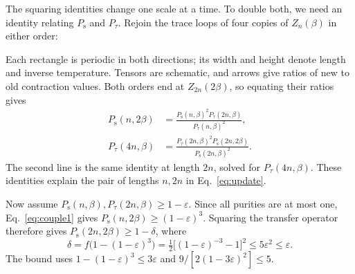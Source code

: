 \documentclass[aps,prl,reprint,amsmath,amssymb,nofootinbib,raggedbottom]{revtex4-2}
\newcommand{\Ps}{P_{\mathrm{s}}}
\newcommand{\Pt}{P_{\tau}}
\newenvironment{proofdiagram}{\par\smallskip\noindent\begin{minipage}{\columnwidth}\centering}{\end{minipage}\par\smallskip}
\newcommand{\netpatch}[4]{%
 \begin{scope}[shift={(#1,#2)}]
 \fill[mpoblue!10] (0,0) rectangle ({.4*#3},{.4*#4});
 \draw[black!35,densely dashed,line width=.35pt]
   (0,0) rectangle ({.4*#3},{.4*#4});
 \foreach \i in {1,...,#3}{
   \draw[wire] ({.4*\i-.2},0)--({.4*\i-.2},{.4*#4});}
 \foreach \j in {1,...,#4}{
   \draw[wire] (0,{.4*\j-.2})--({.4*#3},{.4*\j-.2});
   \foreach \i in {1,...,#3}{
     \node[tensor,minimum size=.10cm] at ({.4*\i-.2},{.4*\j-.2}) {};}}
 \end{scope}}
\begin{document}
The squaring identities change one scale at a time. To double both, we need an
identity relating $\Ps$ and $\Pt$. Rejoin the trace loops of four copies
of $Z_n(\beta)$ in either order:
\begin{proofdiagram}
\end{proofdiagram}
Each rectangle is periodic in both directions; its width and height
denote length and inverse temperature. Tensors are schematic, and
arrows give ratios of new to old contraction values. Both orders end
at $Z_{2n}(2\beta)$, so equating their ratios gives
\begin{align}
 \Ps(n,2\beta)&=\frac{\Ps(n,\beta)^2\Pt(2n,\beta)}{\Pt(n,\beta)^2},
 \label{eq:couple1}\\
 \Pt(4n,\beta)&=\frac{\Pt(2n,\beta)^2\Ps(2n,2\beta)}{\Ps(2n,\beta)^2}.
 \label{eq:couple2}
\end{align}
The second line is the same identity at length $2n$, solved for
$\Pt(4n,\beta)$. These identities explain the pair of lengths $n,2n$
in Eq.~\eqref{eq:update}.

Now assume $\Ps(n,\beta),\Pt(2n,\beta)\ge1-\varepsilon$.
Since all purities are at most one, Eq.~\eqref{eq:couple1} gives
$\Ps(n,2\beta)\ge(1-\varepsilon)^3$. Squaring the transfer operator
therefore gives $\Ps(2n,2\beta)\ge1-\delta$, where
\begin{equation}
 \delta=f\bigl(1-(1-\varepsilon)^3\bigr)
 =\tfrac12\bigl[(1-\varepsilon)^{-3}-1\bigr]^2
 \le5\varepsilon^2\le\varepsilon.
 \label{eq:delta}
\end{equation}
The bound uses $1-(1-\varepsilon)^3\le3\varepsilon$ and
$9/[2(1-3\varepsilon)^2]\le5$.
\end{document}
